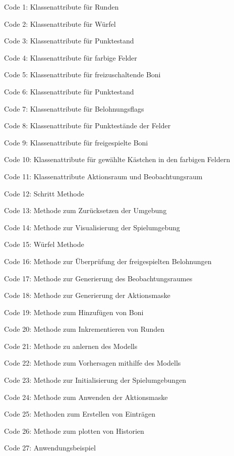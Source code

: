 
Code 1: Klassenattribute für Runden

Code 2: Klassenattribute für Würfel

Code 3: Klassenattribute für Punktestand

Code 4: Klassenattribute für farbige Felder

Code 5: Klassenattribute für freizuschaltende Boni

Code 6: Klassenattribute für Punktestand

Code 7: Klassenattribute für Belohnungsflags

Code 8: Klassenattribute für Punktestände der Felder

Code 9: Klassenattribute für freigespielte Boni

Code 10: Klassenattribute für gewählte Kästchen in den farbigen Feldern

Code 11: Klassenattribute Aktionsraum und Beobachtungsraum

Code 12: Schritt Methode

Code 13: Methode zum Zurücksetzen der Umgebung

Code 14: Methode zur Visualisierung der Spielumgebung

Code 15: Würfel Methode

Code 16: Methode zur Überprüfung der freigespielten Belohnungen

Code 17: Methode zur Generierung des Beobachtungsraumes

Code 18: Methode zur Generierung der Aktionsmaske

Code 19: Methode zum Hinzufügen von Boni

Code 20: Methode zum Inkrementieren von Runden

Code 21: Methode zu anlernen des Modells

Code 22: Methode zum Vorhersagen mithilfe des Modells

Code 23: Methode zur Initialisierung der Spielumgebungen

Code 24: Methode zum Anwenden der Aktionsmaske

Code 25: Methoden zum Erstellen von Einträgen

Code 26: Methode zum plotten von Historien

Code 27: Anwendungsbeispiel
